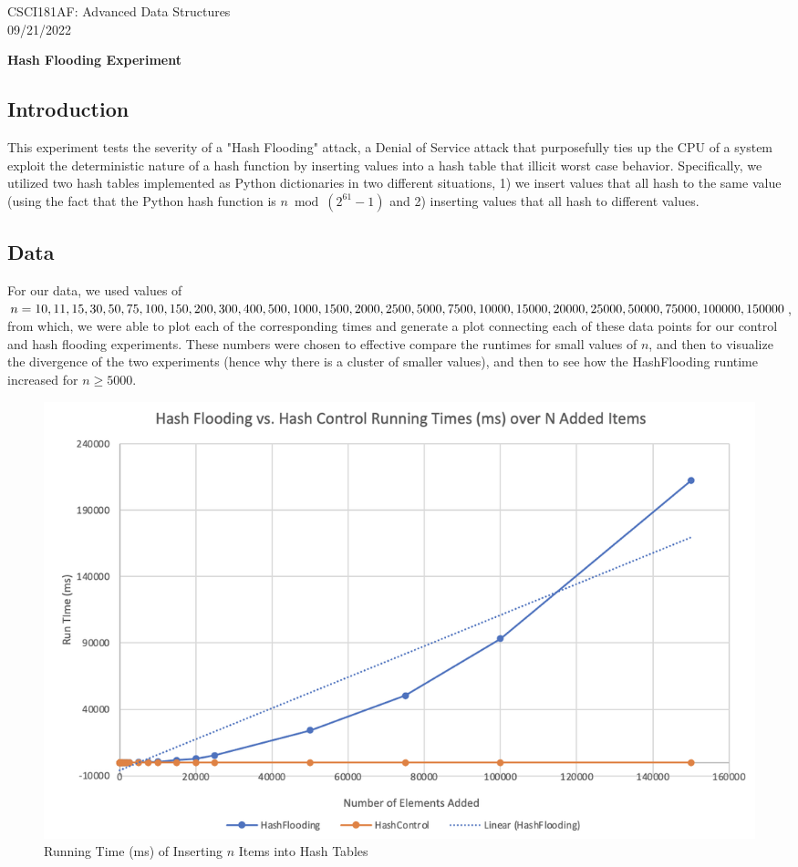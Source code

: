 \documentclass[11pt]{article}
\begin{document}
CSCI181AF: Advanced Data Structures\\
09/21/2022
\begin{center}
    \bf{Hash Flooding Experiment}
\end{center}
\vspace{-4mm}
\subsection*{Introduction}
\vspace{-2mm}
This experiment tests the severity of a "Hash Flooding" attack, a Denial of Service attack that purposefully ties up the CPU of a system exploit the deterministic nature of a hash function by inserting values into a hash table that illicit worst case behavior.
Specifically, we utilized two hash tables implemented as Python dictionaries in two different situations, 1) we insert values that all hash to the same value (using the fact that the Python hash function is $n\bmod (2^{61}-1)$ and 2) inserting values that all hash to different values.
\vspace{-4mm}
\subsection*{Data}
\vspace{-2mm}
For our data, we used values of $n = 10,
11,
15,
30,
50,
75,
100,
150,
200,
300,
400,
500,
1000,
1500,
2000,\\
2500,
5000,
7500,
10000,
15000,
20000,
25000,
50000,
75000,
100000,
150000$, from which, we were able to plot each of the corresponding times and generate a plot connecting each of these data points for our control and hash flooding experiments. These numbers were chosen 
to effective compare the runtimes for small values of $n$, and then to visualize the divergence of the two experiments (hence why there is a cluster of smaller values), and then to see how the HashFlooding runtime increased for $n \geq 5000$.
\begin{figure}[h!]
    \begin{center}
        \includegraphics[scale = 0.6]{hashFloodingGraph.png}
    \end{center}
    \caption{Running Time (ms) of Inserting $n$ Items into Hash Tables}
\end{figure}
\vspace{-5mm}
\end{document}
